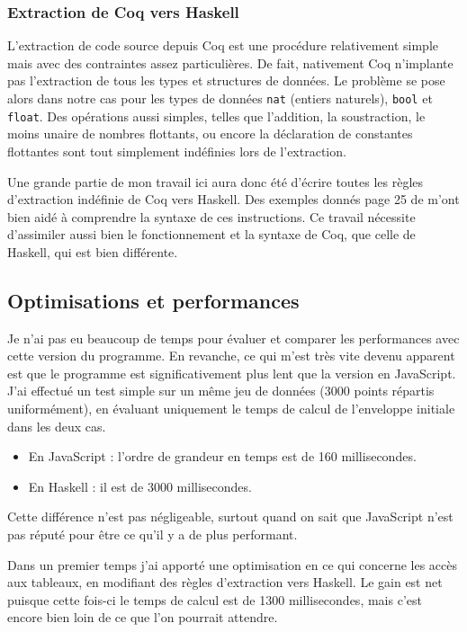 \documentclass[]{article}
\begin{document}
\subsubsection{Extraction de Coq vers Haskell}
L'extraction de code source depuis Coq est une procédure relativement simple mais avec des contraintes assez particulières. De fait, nativement Coq n'implante pas l'extraction de tous les types et structures de données. Le problème se pose alors dans notre cas pour les types de données \texttt{nat} (entiers naturels), \texttt{bool} et \texttt{float}. Des opérations aussi simples, telles que l'addition, la soustraction, le moins unaire de nombres flottants, ou encore la déclaration de constantes flottantes sont tout simplement indéfinies lors de l'extraction.

Une grande partie de mon travail ici aura donc été d'écrire toutes les règles d'extraction indéfinie de Coq vers Haskell. Des exemples donnés page 25 de \cite{magaud:hal-01066671} m'ont bien aidé à comprendre la syntaxe de ces instructions. Ce travail nécessite d'assimiler aussi bien le fonctionnement et la syntaxe de Coq, que celle de Haskell, qui est bien différente.

\subsection{Optimisations et performances}
Je n'ai pas eu beaucoup de temps pour évaluer et comparer les performances avec cette version du programme. En revanche, ce qui m'est très vite devenu apparent est que le programme est significativement plus lent que la version en JavaScript. J'ai effectué un test simple sur un même jeu de données (3000 points répartis uniformément), en évaluant uniquement le temps de calcul de l'enveloppe initiale dans les deux cas.
\begin{itemize}
	\item En JavaScript : l'ordre de grandeur en temps est de 160 millisecondes.
	\item En Haskell : il est de 3000 millisecondes.
\end{itemize}
Cette différence n'est pas négligeable, surtout quand on sait que JavaScript n'est pas réputé pour être ce qu'il y a de plus performant.

Dans un premier temps j'ai apporté une optimisation en ce qui concerne les accès aux tableaux, en modifiant des règles d'extraction vers Haskell. Le gain est net puisque cette fois-ci le temps de calcul est de 1300 millisecondes, mais c'est encore bien loin de ce que l'on pourrait attendre.
\end{document}
